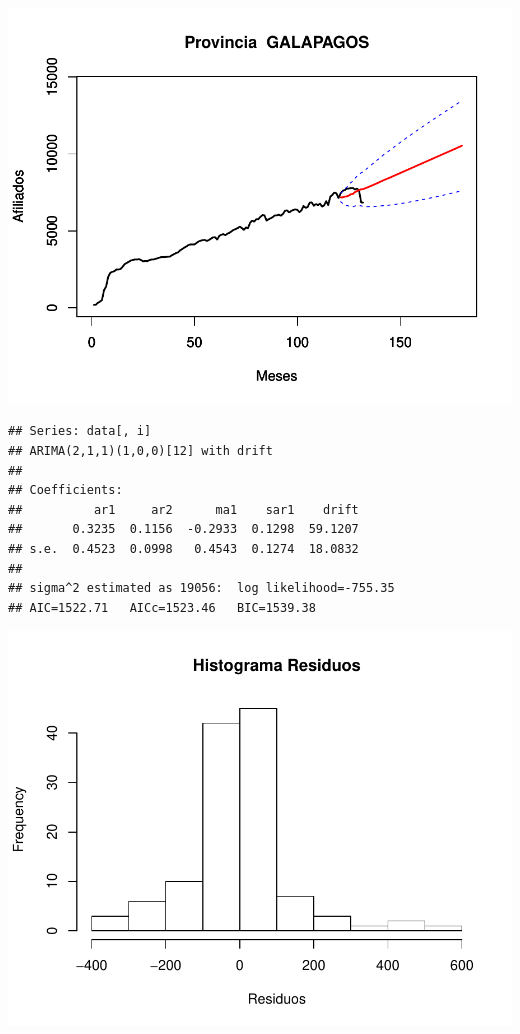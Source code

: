 \documentclass[11pt,a4paper,oneside]{article}\usepackage[]{graphicx}\usepackage[]{color}
\makeatletter
\def\maxwidth{ %
  \ifdim\Gin@nat@width>\linewidth
    \linewidth
  \else
    \Gin@nat@width
  \fi
}
\newenvironment{kframe}{%
 \def\at@end@of@kframe{}%
 \ifinner\ifhmode%
  \def\at@end@of@kframe{\end{minipage}}%
  \begin{minipage}{\columnwidth}%
 \fi\fi%
 \def\FrameCommand##1{\hskip\@totalleftmargin \hskip-\fboxsep
 \colorbox{shadecolor}{##1}\hskip-\fboxsep
     \hskip-\linewidth \hskip-\@totalleftmargin \hskip\columnwidth}%
 \MakeFramed {\advance\hsize-\width
   \@totalleftmargin\z@ \linewidth\hsize
   \@setminipage}}%
 {\par\unskip\endMakeFramed%
 \at@end@of@kframe}
\newenvironment{knitrout}{}{} %
\makeatother
\begin{document}
\begin{knitrout}
{\centering \includegraphics[width=\maxwidth]{figure/unnamed-chunk-16-25} 

}


\begin{kframe}\begin{verbatim}
## Series: data[, i] 
## ARIMA(2,1,1)(1,0,0)[12] with drift         
## 
## Coefficients:
##          ar1     ar2      ma1    sar1    drift
##       0.3235  0.1156  -0.2933  0.1298  59.1207
## s.e.  0.4523  0.0998   0.4543  0.1274  18.0832
## 
## sigma^2 estimated as 19056:  log likelihood=-755.35
## AIC=1522.71   AICc=1523.46   BIC=1539.38
\end{verbatim}
\end{kframe}

{\centering \includegraphics[width=\maxwidth]{figure/unnamed-chunk-16-26} 

}
\end{knitrout}
\end{document}
